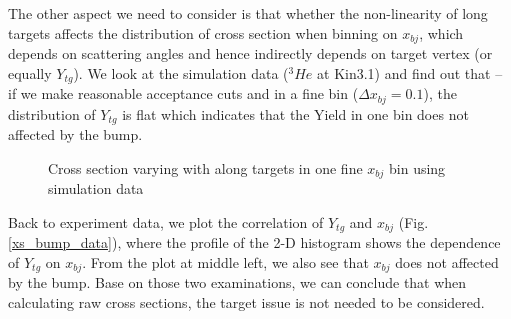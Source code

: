 \documentclass[a4paper,10.5pt]{report}
\begin{document}
The other aspect we need to consider is that whether the non-linearity of long targets affects the distribution of cross section when binning on $x_{bj}$, which depends on scattering angles and hence indirectly depends on target vertex (or equally $Y_{tg}$). We look at the simulation data ($^{3}He$ at Kin3.1) and find out that -- if we make reasonable acceptance cuts and in a fine bin ($\Delta x_{bj} = 0.1$), the distribution of $Y_{tg}$ is flat which indicates that the Yield in one bin does not affected by the bump.

\begin{figure}[!ht]
 \begin{center}

  \caption[Cross section varying with along targets in simulation]{Cross section varying with along targets in one fine $x_{bj}$ bin using simulation data}
  \label{xs_bump_simu}
 \end{center}
\end{figure}

 Back to experiment data, we plot the correlation of $Y_{tg}$ and $x_{bj}$ (Fig.\ref{xs_bump_data}), where the profile of the 2-D histogram shows the dependence of $Y_{tg}$ on $x_{bj}$. From the plot at middle left, we also see that $x_{bj}$ does not affected by the bump. Base on those two examinations, we can conclude that when calculating raw cross sections, the target issue is not needed to be considered.
\end{document}
